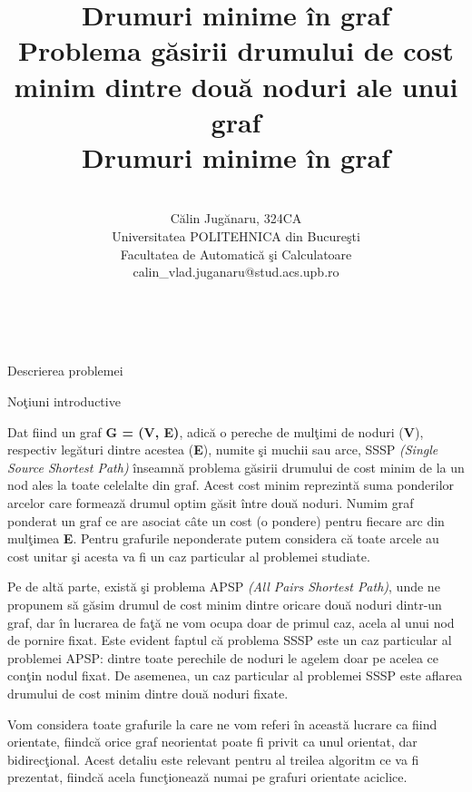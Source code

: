 \documentclass[a4paper]{article}
\title{\Huge \bfseries Drumuri minime \^in graf \\[1.2cm]  \Large Problema g\u asirii drumului de cost minim dintre dou\u a noduri ale unui graf \\[10cm]} \par
\author{\\[1cm] \Large C\u alin Jug\u anaru, 324CA 
	\\[1.8cm] Universitatea POLITEHNICA din Bucure\c sti 
	\\[0.4cm] Facultatea de Automatic\u a \c si Calculatoare
	\\[2cm] calin\_vlad.juganaru@stud.acs.upb.ro \\}
\begin{document}
\maketitle
\pagebreak

\title{\huge \center Drumuri minime \^in graf} \\
\maketitle


\begin{section}{Descrierea problemei}
\begin{subsection}{No\c tiuni introductive\\}
	
	Dat fiind un graf \textbf{G = (V, E)}, adic\u a o pereche de mul\c timi de noduri (\textbf{V}), respectiv leg\u aturi dintre acestea (\textbf{E}), numite \c si muchii sau arce, SSSP \textit{(Single Source Shortest Path)} \^ inseamn\u a problema g\u asirii drumului de cost minim de la un nod ales la toate celelalte din graf. Acest cost minim reprezint\u a suma ponderilor arcelor care formeaz\u a drumul optim g\u asit \^ intre dou\u a noduri. Numim graf ponderat un graf ce are asociat c\^ ate un cost (o pondere) pentru fiecare arc din mul\c timea \textbf{E}. Pentru grafurile neponderate putem considera c\u a toate arcele au cost unitar \c si acesta va fi un caz particular al problemei studiate. \par
	Pe de alt\u a parte, exist\u a \c si problema APSP \textit{(All Pairs Shortest Path)}, unde ne propunem s\u a g\u asim drumul de cost minim dintre oricare dou\u a noduri dintr-un graf, dar \^ in lucrarea de fa\c t\u a ne vom ocupa doar de primul caz, acela al unui nod de pornire fixat. Este evident faptul c\u a problema SSSP este un caz particular al problemei APSP: dintre toate perechile de noduri le agelem doar pe acelea ce con\c tin nodul fixat. De asemenea, un caz particular al problemei SSSP este aflarea drumului de cost minim dintre dou\u a noduri fixate. \par
	Vom considera toate grafurile la care ne vom referi \^ in aceast\u a lucrare ca fiind orientate, fiindc\u a orice graf neorientat poate fi privit ca unul orientat, dar bidirec\c tional. Acest detaliu este relevant pentru al treilea algoritm ce va fi prezentat, fiindc\u a acela func\c tioneaz\u a numai pe grafuri orientate aciclice. \\[1cm]


\end{subsection}
\end{section}
\end{document}
